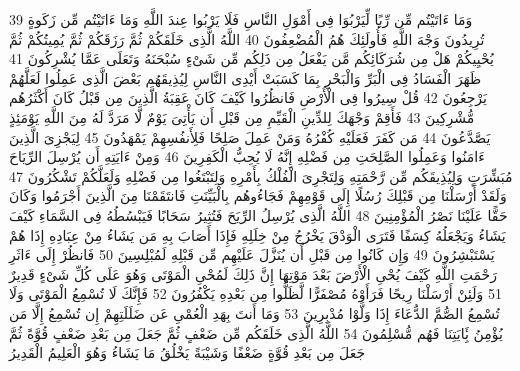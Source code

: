 \documentclass[20pt,a4paper]{article}
\begin{document}
{\tiny\colorbox{cl_aya}{39}} وَمَا ءَاتَيْتُم مِّن رِّبًا لِّيَرْبُوَا فِى أَمْوَلِ النَّاسِ فَلَا يَرْبُوا عِندَ اللَّهِ وَمَا ءَاتَيْتُم مِّن زَكَوةٍ تُرِيدُونَ وَجْهَ اللَّهِ فَأُولَئِكَ هُمُ الْمُضْعِفُونَ
{\tiny\colorbox{cl_aya}{40}} اللَّهُ الَّذِى خَلَقَكُمْ ثُمَّ رَزَقَكُمْ ثُمَّ يُمِيتُكُمْ ثُمَّ يُحْيِيكُمْ هَلْ مِن شُرَكَائِكُم مَّن يَفْعَلُ مِن ذَلِكُم مِّن شَىْءٍ سُبْحَنَهُ وَتَعَلَى عَمَّا يُشْرِكُونَ
{\tiny\colorbox{cl_aya}{41}} ظَهَرَ الْفَسَادُ فِى الْبَرِّ وَالْبَحْرِ بِمَا كَسَبَتْ أَيْدِى النَّاسِ لِيُذِيقَهُم بَعْضَ الَّذِى عَمِلُوا لَعَلَّهُمْ يَرْجِعُونَ
{\tiny\colorbox{cl_aya}{42}} قُلْ سِيرُوا فِى الْأَرْضِ فَانظُرُوا كَيْفَ كَانَ عَقِبَةُ الَّذِينَ مِن قَبْلُ كَانَ أَكْثَرُهُم مُّشْرِكِينَ
{\tiny\colorbox{cl_aya}{43}} فَأَقِمْ وَجْهَكَ لِلدِّينِ الْقَيِّمِ مِن قَبْلِ أَن يَأْتِىَ يَوْمٌ لَّا مَرَدَّ لَهُ مِنَ اللَّهِ يَوْمَئِذٍ يَصَّدَّعُونَ
{\tiny\colorbox{cl_aya}{44}} مَن كَفَرَ فَعَلَيْهِ كُفْرُهُ وَمَنْ عَمِلَ صَلِحًا فَلِأَنفُسِهِمْ يَمْهَدُونَ
{\tiny\colorbox{cl_aya}{45}} لِيَجْزِىَ الَّذِينَ ءَامَنُوا وَعَمِلُوا الصَّلِحَتِ مِن فَضْلِهِ إِنَّهُ لَا يُحِبُّ الْكَفِرِينَ
{\tiny\colorbox{cl_aya}{46}} وَمِنْ ءَايَتِهِ أَن يُرْسِلَ الرِّيَاحَ مُبَشِّرَتٍ وَلِيُذِيقَكُم مِّن رَّحْمَتِهِ وَلِتَجْرِىَ الْفُلْكُ بِأَمْرِهِ وَلِتَبْتَغُوا مِن فَضْلِهِ وَلَعَلَّكُمْ تَشْكُرُونَ
{\tiny\colorbox{cl_aya}{47}} وَلَقَدْ أَرْسَلْنَا مِن قَبْلِكَ رُسُلًا إِلَى قَوْمِهِمْ فَجَاءُوهُم بِالْبَيِّنَتِ فَانتَقَمْنَا مِنَ الَّذِينَ أَجْرَمُوا وَكَانَ حَقًّا عَلَيْنَا نَصْرُ الْمُؤْمِنِينَ
{\tiny\colorbox{cl_aya}{48}} اللَّهُ الَّذِى يُرْسِلُ الرِّيَحَ فَتُثِيرُ سَحَابًا فَيَبْسُطُهُ فِى السَّمَاءِ كَيْفَ يَشَاءُ وَيَجْعَلُهُ كِسَفًا فَتَرَى الْوَدْقَ يَخْرُجُ مِنْ خِلَلِهِ فَإِذَا أَصَابَ بِهِ مَن يَشَاءُ مِنْ عِبَادِهِ إِذَا هُمْ يَسْتَبْشِرُونَ
{\tiny\colorbox{cl_aya}{49}} وَإِن كَانُوا مِن قَبْلِ أَن يُنَزَّلَ عَلَيْهِم مِّن قَبْلِهِ لَمُبْلِسِينَ
{\tiny\colorbox{cl_aya}{50}} فَانظُرْ إِلَى ءَاثَرِ رَحْمَتِ اللَّهِ كَيْفَ يُحْىِ الْأَرْضَ بَعْدَ مَوْتِهَا إِنَّ ذَلِكَ لَمُحْىِ الْمَوْتَى وَهُوَ عَلَى كُلِّ شَىْءٍ قَدِيرٌ
{\tiny\colorbox{cl_aya}{51}} وَلَئِنْ أَرْسَلْنَا رِيحًا فَرَأَوْهُ مُصْفَرًّا لَّظَلُّوا مِن بَعْدِهِ يَكْفُرُونَ
{\tiny\colorbox{cl_aya}{52}} فَإِنَّكَ لَا تُسْمِعُ الْمَوْتَى وَلَا تُسْمِعُ الصُّمَّ الدُّعَاءَ إِذَا وَلَّوْا مُدْبِرِينَ
{\tiny\colorbox{cl_aya}{53}} وَمَا أَنتَ بِهَدِ الْعُمْىِ عَن ضَلَلَتِهِمْ إِن تُسْمِعُ إِلَّا مَن يُؤْمِنُ بَِٔايَتِنَا فَهُم مُّسْلِمُونَ
{\tiny\colorbox{cl_aya}{54}} اللَّهُ الَّذِى خَلَقَكُم مِّن ضَعْفٍ ثُمَّ جَعَلَ مِن بَعْدِ ضَعْفٍ قُوَّةً ثُمَّ جَعَلَ مِن بَعْدِ قُوَّةٍ ضَعْفًا وَشَيْبَةً يَخْلُقُ مَا يَشَاءُ وَهُوَ الْعَلِيمُ الْقَدِيرُ
\end{document}
